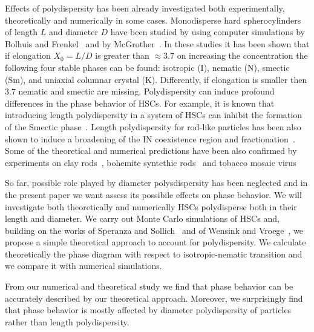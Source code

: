 \documentclass[journal=jacsat,manuscript=article]{achemso}
\begin{document}
Effects of polydispersity has been already investigated both experimentally, theoretically 
and numerically in some cases. 
Monodisperse hard spherocylinders of length $L$ and diameter $D$ have been studied by
using computer simulations by Bolhuis and Frenkel~\cite{Bolhuis1997} and by McGrother~\cite{McGrother96}.
In these studies it has been shown that if elongation $X_0=L/D$ is greater than $\approx 3.7$ 
on increasing the concentration the following four stable phases can be found: isotropic (I), nematic (N), 
smectic (Sm), and uniaxial columnar crystal (K). Differently, if elongation is smaller then $3.7$ nematic and smectic 
are missing. 
Polydispersity can induce profound differences in the phase behavior of HSCs. For example, 
it is known that introducing length polydispersity in a system of HSCs can inhibit the formation of 
the Smectic phase~\cite{Bates1998}. Length polydispersity for rod-like particles has been also shown 
to induce a broadening of the IN coexistence region and fractionation~\cite{Lekkerkerker1984,Speranza2002,Wensink2003}. 
Some of the theoretical and numerical predictions have been also confirmed by experiments on clay rods~\cite{Woolston2015},
bohemite syntethic rods~\cite{Buining1993} and tobacco mosaic virus~\cite{Fraden1993} 

So far, possible role played by diameter polysdispersity has been neglected and in the present 
paper we want assess its possibile effects on phase behavior.
We will investigate both theoretically and numerically HSCs polydisperse both in their length and diameter.
We carry out Monte Carlo simulations of HSCs and, building on the works of Speranza and Sollich~\cite{Speranza2002}
and of Wensink and Vroege~\cite{Wensink2003}, we propose a simple theoretical approach to account for polydispersity. 
We calculate theoretically the phase diagram with respect to isotropic-nematic transition and we compare it with numerical simulations.

From our numerical and theoretical study we find that phase behavior can be accurately described by our theoretical approach.
Moreover, we surprisingly find that phase behavior is mostly affected by diameter polydispersity of particles
rather than length polydispersity. 

\end{document}
